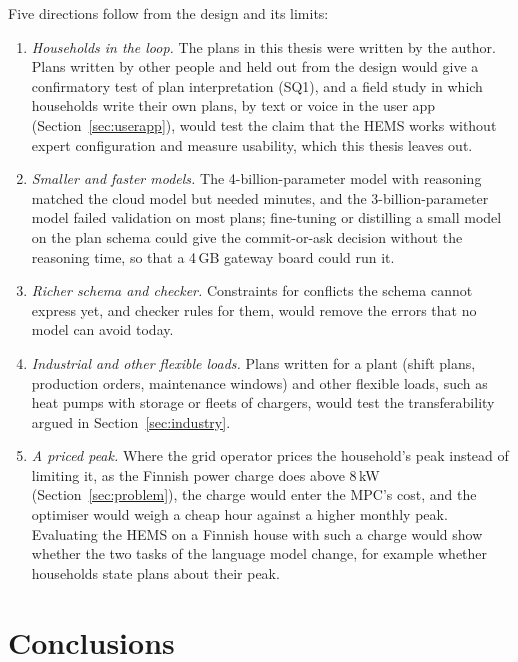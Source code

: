 Five directions follow from the design and its limits:

\begin{enumerate}
\item \textit{Households in the loop.} The plans in this thesis were
written by the author. Plans written by other people and held out from
the design would give a confirmatory test of plan interpretation (SQ1),
and a field study in which households write their own plans, by text or
voice in the user app (Section~\ref{sec:userapp}), would test the claim
that the HEMS works without expert configuration and measure usability,
which this thesis leaves out.
\item \textit{Smaller and faster models.} The 4-billion-parameter model
with reasoning matched the cloud model but needed minutes, and the
3-billion-parameter model failed validation on most plans; fine-tuning or distilling a small model on the
plan schema could give the commit-or-ask decision without the reasoning
time, so that a 4\,GB gateway board could run it.
\item \textit{Richer schema and checker.} Constraints for conflicts the
schema cannot express yet, and checker rules for them, would remove the
errors that no model can avoid today.
\item \textit{Industrial and other flexible loads.} Plans written for a
plant (shift plans, production orders, maintenance windows) and other
flexible loads, such as heat pumps with storage or fleets of chargers,
would test the transferability argued in Section~\ref{sec:industry}.
\item \textit{A priced peak.} Where the grid operator prices the
household's peak instead of limiting it, as the Finnish power charge
does above 8\,kW (Section~\ref{sec:problem}), the charge would enter
the MPC's cost, and the optimiser would weigh a cheap hour against a
higher monthly peak. Evaluating the HEMS on a Finnish house with such a
charge would show whether the two tasks of the language model change,
for example whether households state plans about their peak.
\end{enumerate}

\chapter{Conclusions}
\label{ch:conclusions}

